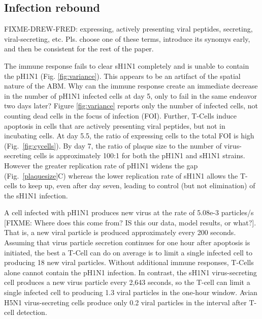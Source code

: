\documentclass[10pt]{article}
\begin{document}
\subsection*{Infection rebound}

FIXME-DREW-FRED: expressing, actively presenting viral peptides, secreting, viral-secreting, etc.  Pls. choose one of these terms, introduce its synomys early, and then
be consistent for the rest of the paper.

The immune response fails to clear sH1N1 completely and is unable to contain the pH1N1 (Fig. \ref{fig:variance}).  This appears to be an artifact of the spatial nature of the ABM.  Why can the immune response create an immediate decrease in the number of pH1N1 infected cells at day 5, only to fail in the same endeavor two days later?   Figure \ref{fig:variance} reports only the number of infected cells, not counting dead cells in the focus of infection (FOI).  Further, T-Cells induce apoptosis 
in cells that are actively presenting viral peptides, but not in incubating cells.  At day 5.5, the ratio of expressing cells to the total FOI is high (Fig.~\ref{fig:cycells}).  
By day 7, the ratio of plaque size to the number of virus-secreting cells is approximately 100:1 for both the pH1N1 and sH1N1 strains.  However the greater replication rate of pH1N1 widens the gap (Fig.~\ref{plaquesize}C) whereas the lower replication rate of sH1N1 allows the T-cells to keep up, even after day seven, leading to control (but not elimination) of the sH1N1 infection.

A cell infected with pH1N1  produces new virus at the rate of 5.08e-3 particles/s [FIXME: Where does this come from? IS this our data, model results, or what?].  That is,   a new viral particle is produced approximately every 200 seconds.  Assuming that virus particle secretion continues for one hour after apoptosis is initiated, the best a T-Cell can do on average is to limit a single infected cell to producing 18 new viral particles.  Without additional immune responses,  T-Cells alone cannot  contain the pH1N1 infection.  In contrast, the sH1N1 virus-secreting cell produces a new virus particle every 2,643 seconds, so the T-cell can limit a single infected cell to producing 1.3 viral particles in the one-hour window.  Avian H5N1 virus-secreting cells produce only 0.2 viral particles in the interval after T-cell detection. 
\end{document}
